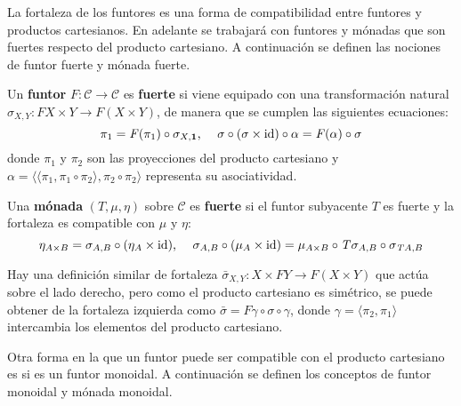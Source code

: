 La fortaleza de los funtores es una forma de compatibilidad entre funtores y productos cartesianos. En adelante se trabajará con funtores y mónadas que son fuertes respecto del producto cartesiano. A continuación se definen las nociones de funtor fuerte y mónada fuerte.

\begin{definition}
Un \textbf{funtor} $\mathit{F} : \mathscr{C} \rightarrow \mathscr{C}$  es \textbf{fuerte} si viene equipado con una transformación natural $\sigma_{X,Y} : \mathit{F}X \times Y \rightarrow \mathit{F} (X \times Y)$, de manera que se cumplen las siguientes ecuaciones:
\begin{equation*}
	\pi_1 = \mathit{F}(\pi_1) \circ \sigma_{X,\mathbf{1}} \text{, \quad} \sigma \circ (\sigma \times \text{id}) \circ \alpha = \mathit{F}(\alpha) \circ \sigma 
\end{equation*} 
donde $\pi_1$ y $\pi_2$ son las proyecciones del producto cartesiano y $\alpha = \langle \langle \pi_1 , \pi_1 \circ \pi_2 \rangle , \pi_2 \circ \pi_2 \rangle$ representa su asociatividad.
\end{definition}

\begin{definition}
Una \textbf{mónada} $(\mathit{T},\mu,\eta)$ sobre $\mathscr{C}$ es \textbf{fuerte} si el funtor subyacente $\mathit{T}$ es fuerte y la fortaleza es compatible con $\mu$ y $\eta$: 
\begin{equation*}
\eta_{A \times B} = \sigma_{A,B} \circ (\eta_A \times \text{id}) \text{, \quad} \sigma_{A,B} \circ (\mu_A \times \text{id}) = \mu_{A \times B} \circ \mathit{T}\sigma_{A,B} \circ \sigma_{\mathit{T}A,B}
\end{equation*}
\end{definition}

Hay una definición similar de fortaleza $\bar{\sigma}_{X,Y} : X \times \mathit{F}Y \rightarrow \mathit{F} (X \times Y)$ que actúa sobre el lado derecho, pero como el producto cartesiano es simétrico, se puede obtener de la fortaleza izquierda como $\bar{\sigma} = \mathit{F} \gamma \circ \sigma \circ \gamma$, donde $\gamma = \langle \pi_2 , \pi_1 \rangle$ intercambia los elementos del producto cartesiano.

Otra forma en la que un funtor puede ser compatible con el producto cartesiano es si es un funtor monoidal. A continuación se definen los conceptos de funtor monoidal y mónada monoidal.

